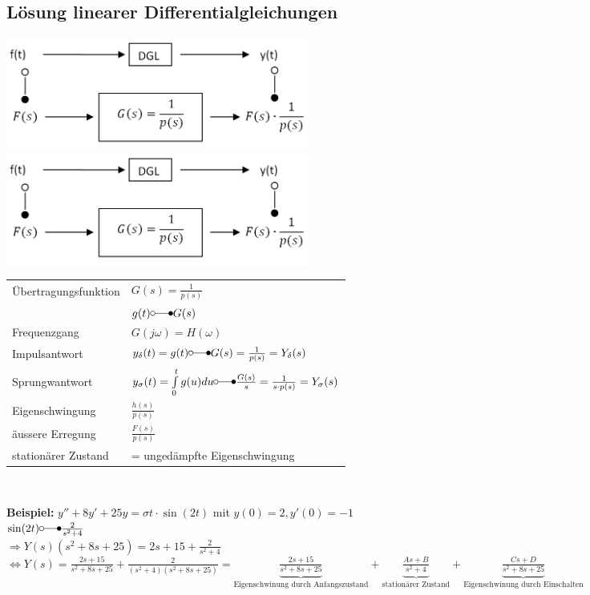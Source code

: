 	\subsection{Lösung linearer Differentialgleichungen}
		\includegraphics[width=10cm]{./bilder/diffgleichungen2.png}
		\includegraphics[width=10cm]{./bilder/diffgleichungen.png} \\
		\renewcommand{\arraystretch}{2}
		\begin{tabular}{| l | l |}
			\hline
				Übertragungsfunktion & $G(s) = \frac{1}{p(s)}$\\
				& $g(t) \laplace G(s)$ \\
			\hline
				Frequenzgang & $G(j\omega) = H(\omega)$ \\
			\hline
				Impulsantwort & $y_{\delta}(t) = g(t) \laplace G(s) = \frac{1}{p(s)}=Y_{\delta}(s)$\\
			\hline
				Sprungwantwort & $y_{\sigma}(t)=\int\limits_0^t g(u) du \laplace \frac{G(s)}{s} = \frac{1}{s \cdot p(s)} = Y_{\sigma}(s)$\\
			\hline
				Eigenschwingung & $\frac{h(s)}{p(s)}$ \\
			\hline
				äussere Erregung & $\frac{F(s)}{p(s)}$ \\
			\hline
				stationärer Zustand & = ungedämpfte Eigenschwingung\\
			\hline
		\end{tabular}
		\renewcommand{\arraystretch}{\arraystretchOriginal}\\
		
		\begin{minipage}[l]{16cm}
				\textbf{Beispiel:} $y'' + 8y' + 25y = \sigma{t} \cdot \sin(2t)$ mit $y(0) = 2, y'(0) = -1$\\
				
				$\sin(2t) \laplace \frac{2}{s^2+4}$ \\
				
				$\Rightarrow Y(s)(s^2+8s+25) = 2s+15+\frac{2}{s^2+4}$\\
				
				$\Leftrightarrow Y(s) = \frac{2s+15}{s^2+8s+25}+\frac{2}{(s^2+4)(s^2+8s+25)}=
				\underbrace{\frac{2s+15}{s^2+8s+25}}_\text{Eigenschwinung durch Anfangszustand} +
				\underbrace{\frac{As + B}{s^2+4}}_\text{stationärer Zustand} +
				\underbrace{\frac{Cs + D}{s^2+8s+25}}_\text{Eigenschwinung durch Einschalten}$
		\end{minipage}
		
